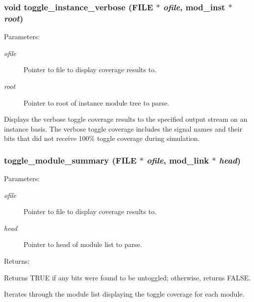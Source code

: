 \subsubsection{\setlength{\rightskip}{0pt plus 5cm}void toggle\_\-instance\_\-verbose (FILE $\ast$ {\em ofile}, {\bf mod\_\-inst} $\ast$ {\em root})}\label{toggle_8c_a7}


\begin{Desc}
\item[Parameters: ]\par
\begin{description}
\item[{\em 
ofile}]Pointer to file to display coverage results to. \item[{\em 
root}]Pointer to root of instance module tree to parse.\end{description}
\end{Desc}
Displays the verbose toggle coverage results to the specified output stream on an instance basis. The verbose toggle coverage includes the signal names and their bits that did not receive 100\% toggle coverage during simulation. 
\subsubsection{ toggle\_\-module\_\-summary (FILE $\ast$ {\em ofile}, {\bf mod\_\-link} $\ast$ {\em head})}\label{toggle_8c_a5}


\begin{Desc}
\item[Parameters: ]\par
\begin{description}
\item[{\em 
ofile}]Pointer to file to display coverage results to. \item[{\em 
head}]Pointer to head of module list to parse.\end{description}
\end{Desc}
\begin{Desc}
\item[Returns: ]\par
Returns TRUE if any bits were found to be untoggled; otherwise, returns FALSE.\end{Desc}
Iterates through the module list displaying the toggle coverage for each module. 
